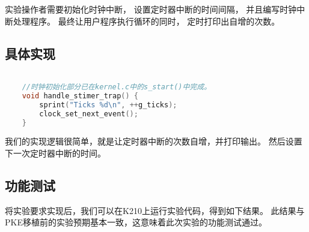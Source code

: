 实验操作者需要初始化时钟中断，
设置定时器中断的时间间隔，
并且编写时钟中断处理程序。
最终让用户程序执行循环的同时，
定时打印出自增的次数。



\subsection{具体实现}

\begin{lstlisting}[caption={定时器中断处理程序}, label={lst:app_timer_handler}, language=C]

    //时钟初始化部分已在kernel.c中的s_start()中完成。
    void handle_stimer_trap() {
        sprint("Ticks %d\n", ++g_ticks);
        clock_set_next_event();
    }    
\end{lstlisting}

我们的实现逻辑很简单，就是让定时器中断的次数自增，并打印输出。
然后设置下一次定时器中断的时间。

\subsection{功能测试}

将实验要求实现后，我们可以在K210上运行实验代码，得到如下结果。
此结果与PKE移植前的实验预期基本一致，这意味着此次实验的功能测试通过。

